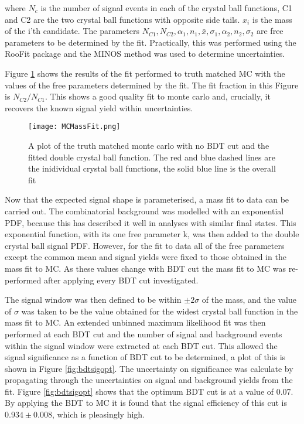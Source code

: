   where $N_{c}$ is the number of signal events in each of the crystal ball functions, C1 and C2 are the two crystal ball functions with opposite side tails.  $x_{i}$ is the mass of the i'th \Bd candidate. The parameters $N_{C1}, N_{C2},\alpha_1, n_1,\bar{x}, \sigma_1, \alpha_2,n_2,\sigma_2$ are free parameters to be determined by the fit.  Practically, this was performed using the RooFit package and the MINOS method was used to determine uncertainties\cite{Verkerke:2003ir}.

  Figure \ref{fig:MCfit} shows the results of the fit performed to truth matched MC with the values of the free parameters determined by the fit.  The fit fraction in this Figure is $N_{C2}/N_{C1}$.  This shows a good quality fit to monte carlo and, crucially, it recovers the known signal yield within uncertainties.

  \begin{figure}
    \centering
    \texttt{[image: MCMassFit.png]}
    \caption{A plot of the truth matched monte carlo with no BDT cut and the fitted double crystal ball function.  The red and blue dashed lines are the inidividual crystal ball functions, the solid blue line is the overall fit}
    \label{fig:MCfit}
  \end{figure}

  Now that the expected signal shape is parameterised, a mass fit to data can be carried out.  The combinatorial background was modelled with an exponential PDF, because this has described it well in analyses with similar final states\cite{LHCb-PAPER-2015-019}.  This exponential function, with its one free parameter k, was then added to the double crystal ball signal PDF.  However, for the fit to data all of the free parameters except the common mean and signal yields were fixed to those obtained in the mass fit to MC.  As these values change with BDT cut the mass fit to MC was re-performed after applying every BDT cut investigated.

  The signal window was then defined to be within $\pm2\sigma$ of the \Bd mass, and the value of $\sigma$ was taken to be the value obtained for the widest crystal ball function in the mass fit to MC. An extended unbinned maximum likelihood fit was then performed at each BDT cut and the number of signal and background events within the signal window were extracted at each BDT cut.  This allowed the signal significance as a function of BDT cut to be determined, a plot of this is shown in Figure \ref{fig:bdtsigopt}.  The uncertainty on significance was calculate by propagating through the uncertainties on signal and background yields from the fit.  Figure \ref{fig:bdtsigopt} shows that the optimum BDT cut is at a value of 0.07.  By applying the BDT to MC it is found that the signal efficiency of this cut is $0.934\pm0.008$, which is pleasingly high.

